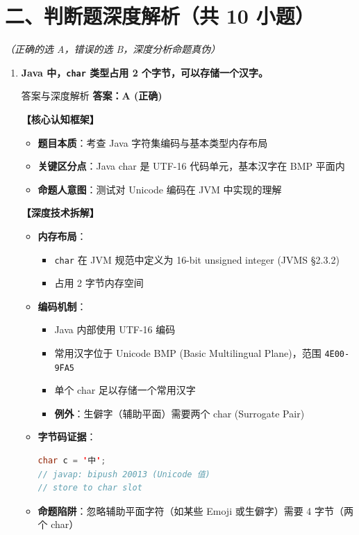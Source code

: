 \documentclass[12pt, a4paper]{ctexart}
\newcommand{\code}[1]{\texttt{#1}}
\begin{document}
\section*{二、判断题深度解析（共 10 小题）}
\textit{（正确的选 A，错误的选 B，深度分析命题真伪）}

\begin{enumerate}[label=\textbf{\arabic*.}, leftmargin=*, itemsep=1.5em]
	\item \textbf{Java 中，\code{char} 类型占用 2 个字节，可以存储一个汉字。}
	      \begin{bluebox}{答案与深度解析}
		      \textbf{答案：A (正确)}

		      \textbf{【核心认知框架】}
		      \begin{itemize}[leftmargin=*, nosep]
			      \item \textbf{题目本质}：考查 Java 字符集编码与基本类型内存布局
			      \item \textbf{关键区分点}：Java char 是 UTF-16 代码单元，基本汉字在 BMP 平面内
			      \item \textbf{命题人意图}：测试对 Unicode 编码在 JVM 中实现的理解
		      \end{itemize}

		      \textbf{【深度技术拆解】}
		      \begin{itemize}[leftmargin=*, nosep]
			      \item \textbf{内存布局}：
			            \begin{itemize}
				            \item \code{char} 在 JVM 规范中定义为 16-bit unsigned integer (JVMS §2.3.2)
				            \item 占用 2 字节内存空间
			            \end{itemize}
			      \item \textbf{编码机制}：
			            \begin{itemize}
				            \item Java 内部使用 UTF-16 编码
				            \item 常用汉字位于 Unicode BMP (Basic Multilingual Plane)，范围 \code{\u4E00-\u9FA5}
				            \item 单个 char 足以存储一个常用汉字
				            \item \textbf{例外}：生僻字（辅助平面）需要两个 char (Surrogate Pair)
			            \end{itemize}
			      \item \textbf{字节码证据}：
			            \begin{lstlisting}[language=Java]
char c = '中';
// javap: bipush 20013 (Unicode 值)
// store to char slot
    \end{lstlisting}
			      \item \textbf{命题陷阱}：忽略辅助平面字符（如某些 Emoji 或生僻字）需要 4 字节（两个 char）
		      \end{itemize}


\end{bluebox}
\end{enumerate}
\end{document}

